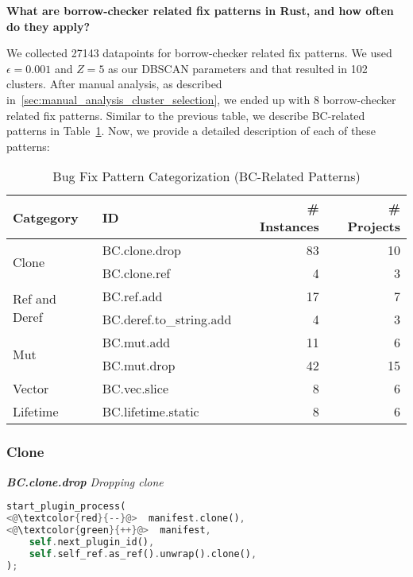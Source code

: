 \textbf{What are borrow-checker related fix patterns in Rust, and how often do they apply?} 

We collected 27143 datapoints for borrow-checker related fix patterns. We used $\epsilon=0.001$ and $Z=5$ as our DBSCAN parameters and that resulted in 102 clusters. After manual analysis, as described in~\ref{sec:manual_analysis_cluster_selection}, we ended up with 8 borrow-checker related fix patterns. Similar to the previous table, we describe BC-related patterns in Table~\ref{table:bc}. Now, we provide a detailed description of each of these patterns:

\begin{table}[]
\begin{tabular}{l|l|r|r}
\textbf{Catgegory} & \textbf{ID} & \textbf{\# Instances} & \textbf{\# Projects} \\
\hline
\multirow{2}{*}{Clone}                                         & BC.clone.drop & 83 & 10 \\
& BC.clone.ref & 4 & 3   
\\\cline{1-4}
\multirow{2}{*}{Ref and Deref} & BC.ref.add & 17 & 7 \\
& BC.deref.to\_string.add  & 4 & 3                                            \\\cline{1-4}
\multirow{2}{*}{Mut} & BC.mut.add  & 11 & 6 \\
& BC.mut.drop  & 42 & 15                               \\\cline{1-4}
Vector & BC.vec.slice  & 8 & 6                                    \\\cline{1-4}
\multirow{1}{*}{Lifetime}      
& BC.lifetime.static  & 8 & 6
\\
\end{tabular}
\caption{\label{table:bc}Bug Fix Pattern Categorization (BC-Related Patterns)}
\end{table}
    

\subsubsection{Clone}

\noindent\textit{\textbf{BC.clone.drop} Dropping clone}

\begin{lstlisting}[language=Rust, style=colouredRust]
start_plugin_process(
<@\textcolor{red}{--}@>  manifest.clone(),
<@\textcolor{green}{++}@>  manifest,
    self.next_plugin_id(),
    self.self_ref.as_ref().unwrap().clone(),
);
\end{lstlisting}

